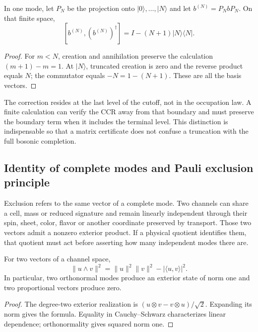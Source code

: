 \begin{proposition}
\label{vi:vi:prop:corte-bosonico}
In one mode, let \(P_N\) be the projection onto
\(|0\rangle,\ldots,|N\rangle\) and let \(b^{(N)}=P_NbP_N\).
On that finite space,
\[
 [b^{(N)},(b^{(N)})^\dagger]
 =I-(N+1)|N\rangle\langle N|.
\]
\end{proposition}
\begin{proof}
For \(m<N\), creation and annihilation preserve the calculation
\((m+1)-m=1\). At \(|N\rangle\), truncated creation is
zero and the reverse product equals \(N\); the commutator equals
\(-N=1-(N+1)\). These are all the basis vectors.
\end{proof}

The correction resides at the last level of the cutoff, not in the occupation
law. A finite calculation can verify the CCR away from that
boundary and must preserve the boundary term when it includes the
terminal level. This distinction is indispensable so that a
matrix certificate does not confuse a truncation with the
full bosonic completion.

\subsection{Identity of complete modes and Pauli exclusion principle}
\label{vi:vi:subsec:pauli-etiquetas-hojas}

Exclusion refers to the same vector of a complete mode. Two
channels can share a cell, mass or reduced signature and remain
linearly independent through their spin, sheet, color,
flavor or another coordinate preserved by transport. Those two
vectors admit a nonzero exterior product. If a physical
quotient identifies them, that quotient must act before asserting
how many independent modes there are.

\begin{proposition}
\label{vi:vi:prop:pauli-gram}
For two vectors of a channel space,
\[
 \|u\wedge v\|^2
 =\|u\|^2\|v\|^2-|\langle u,v\rangle|^2.
\]
In particular, two orthonormal modes produce an exterior state
of norm one and two proportional vectors produce zero.
\end{proposition}
\begin{proof}
The degree-two exterior realization is
\((u\otimes v-v\otimes u)/\sqrt2\). Expanding its norm gives
the formula. Equality in Cauchy--Schwarz characterizes linear
dependence; orthonormality gives squared norm one.
\end{proof}

